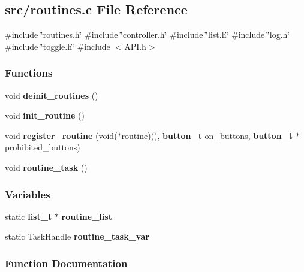 \subsection{src/routines.c File Reference}
\label{routines_8c}
{\ttfamily \#include \char`\"{}routines.\+h\char`\"{}}\newline
{\ttfamily \#include \char`\"{}controller.\+h\char`\"{}}\newline
{\ttfamily \#include \char`\"{}list.\+h\char`\"{}}\newline
{\ttfamily \#include \char`\"{}log.\+h\char`\"{}}\newline
{\ttfamily \#include \char`\"{}toggle.\+h\char`\"{}}\newline
{\ttfamily \#include $<$A\+P\+I.\+h$>$}\newline
\subsubsection*{Functions}
\begin{DoxyCompactItemize}
\item 
void \textbf{ deinit\+\_\+routines} ()
\item 
void \textbf{ init\+\_\+routine} ()
\item 
void \textbf{ register\+\_\+routine} (void($\ast$routine)(), \textbf{ button\+\_\+t} on\+\_\+buttons, \textbf{ button\+\_\+t} $\ast$prohibited\+\_\+buttons)
\item 
void \textbf{ routine\+\_\+task} ()
\end{DoxyCompactItemize}
\subsubsection*{Variables}
\begin{DoxyCompactItemize}
\item 
static \textbf{ list\+\_\+t} $\ast$ \textbf{ routine\+\_\+list}
\item 
static Task\+Handle \textbf{ routine\+\_\+task\+\_\+var}
\end{DoxyCompactItemize}


\subsubsection{Function Documentation}
\mbox{\label{routines_8c_ad908adbc884189372f72f882ec62d71d}} 
